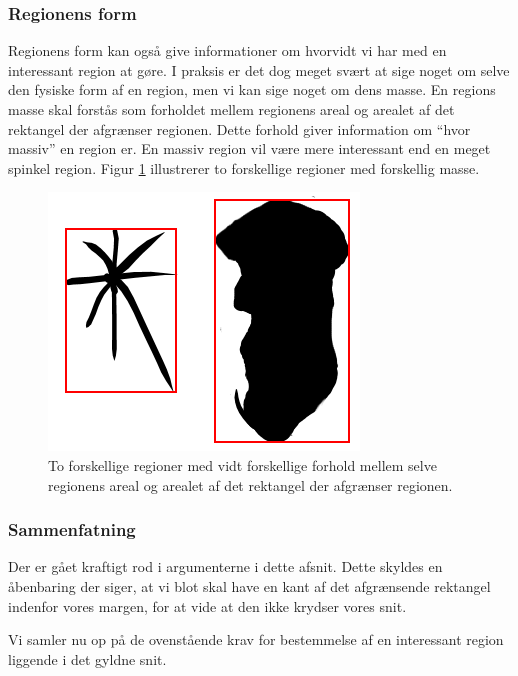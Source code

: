 {\subsubsection{Regionens form}
Regionens form kan også give informationer om hvorvidt vi har med en
interessant region at gøre. I praksis er det dog meget svært at sige
noget om selve den fysiske form af en region, men vi kan sige noget om
dens masse. En regions masse skal forstås som forholdet mellem regionens areal og
arealet af det rektangel der afgrænser regionen. Dette forhold giver
information om ``hvor massiv'' en region er. En massiv region vil være
mere interessant end en meget spinkel region. Figur \ref{region_mass}
illustrerer to forskellige regioner med forskellig masse.
\begin{figure}[h]
	\begin{center}
		\includegraphics[scale=\imgscale,angle=0]{afsnit/vores_implementation/billeder/naiv_algoritme/bbox_area_ratio}
	\end{center}
	\caption[Regioners masse]{To forskellige regioner med vidt forskellige forhold
	mellem selve regionens areal og arealet af det rektangel der
	afgrænser regionen.}
	\label{region_mass}
\end{figure}

\subsubsection{Sammenfatning}
\textsf{Der er gået kraftigt rod i argumenterne i dette afsnit. Dette
skyldes en åbenbaring der siger, at vi blot skal have en kant af det
afgrænsende rektangel indenfor vores margen, for at vide at den ikke
krydser vores snit.}

Vi samler nu op på de ovenstående krav for bestemmelse af en interessant
region liggende i det gyldne snit.

}
